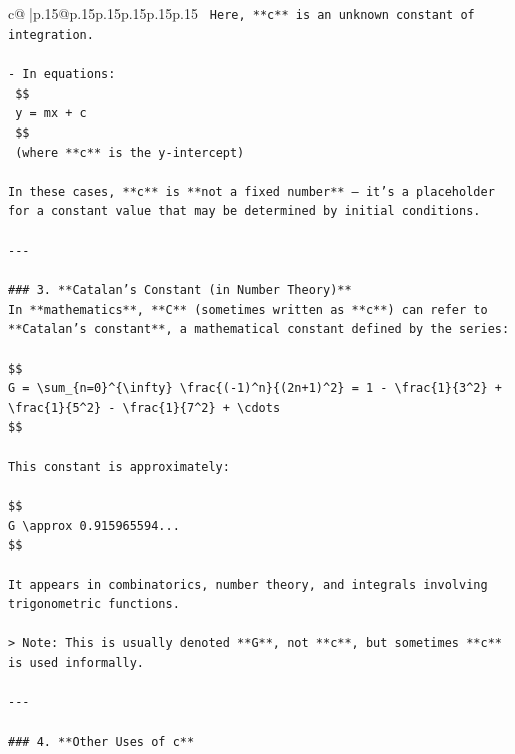 \documentclass{article}
\begin{document}
{\begin{supertabular}{c@{$\;$}|p{.15\linewidth}@{}p{.15\linewidth}p{.15\linewidth}p{.15\linewidth}p{.15\linewidth}p{.15\linewidth}}
{{{\texttt{  Here, **c** is an unknown constant of integration.} \\
\\ 
\texttt{{-} In equations:  } \\
\texttt{  \$\$} \\
\texttt{  y = mx + c} \\
\texttt{  \$\$} \\
\texttt{  (where **c** is the y{-}intercept)} \\
\\ 
\texttt{In these cases, **c** is **not a fixed number** — it's a placeholder for a constant value that may be determined by initial conditions.} \\
\\ 
\texttt{{-}{-}{-}} \\
\\ 
\texttt{\#\#\# 3. **Catalan's Constant (in Number Theory)**} \\
\texttt{In **mathematics**, **C** (sometimes written as **c**) can refer to **Catalan's constant**, a mathematical constant defined by the series:} \\
\\ 
\texttt{\$\$} \\
\texttt{G = \textbackslash{}sum\_\{n=0\}\^{}\{\textbackslash{}infty\} \textbackslash{}frac\{({-}1)\^{}n\}\{(2n+1)\^{}2\} = 1 {-} \textbackslash{}frac\{1\}\{3\^{}2\} + \textbackslash{}frac\{1\}\{5\^{}2\} {-} \textbackslash{}frac\{1\}\{7\^{}2\} + \textbackslash{}cdots} \\
\texttt{\$\$} \\
\\ 
\texttt{This constant is approximately:} \\
\\ 
\texttt{\$\$} \\
\texttt{G \textbackslash{}approx 0.915965594...} \\
\texttt{\$\$} \\
\\ 
\texttt{It appears in combinatorics, number theory, and integrals involving trigonometric functions.} \\
\\ 
\texttt{> Note: This is usually denoted **G**, not **c**, but sometimes **c** is used informally.} \\
\\ 
\texttt{{-}{-}{-}} \\
\\ 
\texttt{\#\#\# 4. **Other Uses of c**} \\
}}}
\end{supertabular}}
\end{document}

